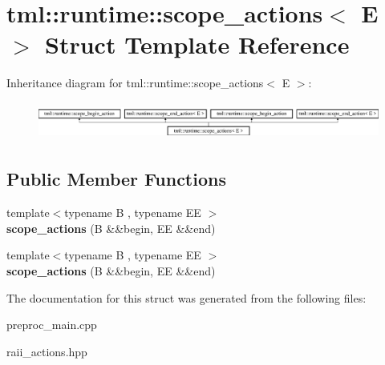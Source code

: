 \hypertarget{structtml_1_1runtime_1_1scope__actions}{\section{tml\+:\+:runtime\+:\+:scope\+\_\+actions$<$ E $>$ Struct Template Reference}
\label{structtml_1_1runtime_1_1scope__actions}
}
Inheritance diagram for tml\+:\+:runtime\+:\+:scope\+\_\+actions$<$ E $>$\+:\begin{figure}[H]
\begin{center}
\leavevmode
\includegraphics[height=1.255605cm]{structtml_1_1runtime_1_1scope__actions}
\end{center}
\end{figure}
\subsection*{Public Member Functions}
\begin{DoxyCompactItemize}
\item 
\hypertarget{structtml_1_1runtime_1_1scope__actions_a0a4bfd3d1a1e1ce8c88f4d2bad15027f}{{\footnotesize template$<$typename B , typename E\+E $>$ }\\{\bfseries scope\+\_\+actions} (B \&\&begin, E\+E \&\&end)}\label{structtml_1_1runtime_1_1scope__actions_a0a4bfd3d1a1e1ce8c88f4d2bad15027f}

\item 
\hypertarget{structtml_1_1runtime_1_1scope__actions_a0a4bfd3d1a1e1ce8c88f4d2bad15027f}{{\footnotesize template$<$typename B , typename E\+E $>$ }\\{\bfseries scope\+\_\+actions} (B \&\&begin, E\+E \&\&end)}\label{structtml_1_1runtime_1_1scope__actions_a0a4bfd3d1a1e1ce8c88f4d2bad15027f}

\end{DoxyCompactItemize}


The documentation for this struct was generated from the following files\+:\begin{DoxyCompactItemize}
\item 
preproc\+\_\+main.\+cpp\item 
raii\+\_\+actions.\+hpp\end{DoxyCompactItemize}

